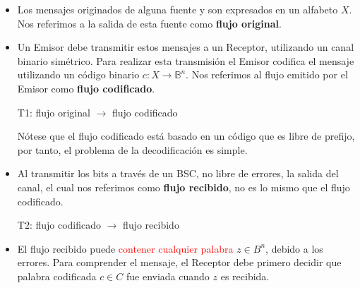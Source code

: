 \documentclass{beamer}
\theoremstyle{plain}
\theoremstyle{example}
\theoremstyle{example}
\begin{document}
\begin{frame}  \footnotesize  
\begin{itemize} 

\item Los mensajes originados de alguna fuente y son expresados en un alfabeto $X$. Nos referimos a la salida de esta fuente como \textbf{flujo original}. 

 \item Un Emisor debe transmitir estos mensajes a un Receptor, utilizando un canal binario simétrico.   Para realizar esta transmisión el Emisor codifica el mensaje utilizando un código binario $c: X \rightarrow\mathbb{B}^{n}$. Nos referimos al flujo emitido por el Emisor como \textbf{flujo codificado}. 
 
\begin{center}
T1:	flujo original  $\longrightarrow$ flujo codificado
\end{center}

\tiny Nótese que el flujo codificado está basado en un código que es libre de prefijo, por tanto, el problema de la decodificación es simple.
 
 \footnotesize
 
 \item Al transmitir los bits a través de un BSC, no libre de errores,  la salida del canal, el cual nos referimos como \textbf{flujo recibido}, no es lo mismo que el flujo codificado.
\begin{center}
T2:	flujo codificado  $\longrightarrow$ flujo recibido
\end{center}

 \item  El flujo recibido puede \textcolor{red}{contener cualquier palabra} $z \in B^n$, debido a los errores. Para comprender el mensaje, el Receptor debe primero decidir que palabra codificada $c\in C$ fue enviada cuando $z$ es recibida. 

 
\end{itemize}
\end{frame} 
\end{document}
